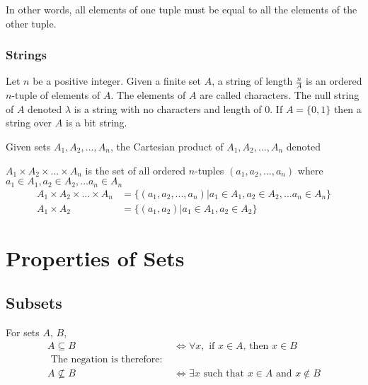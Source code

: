 \documentclass[11pt]{article}
\begin{document}
In other words, all elements of one tuple must be equal to all the elements of the other tuple.

\subsubsection{Strings}
\begin{definition}[Strings]\label{def:string}
    Let $n$ be a positive integer. Given a finite set $A$, a string
    of length $\frac{n}{A}$ is an ordered $n$-tuple of elements of $A$.
    The elements of $A$ are called characters. The null string of $A$
    denoted $\lambda$ is a string with no characters and length of $0$.
    If $A = \{0, 1\}$ then a string over $A$ is a bit string.
\end{definition}

\begin{definition}\label{def:cartesian-product}
    Given sets $A_1, A_2, ..., A_n$, the Cartesian product of $A_1, A_2, ..., A_n$
    denoted

    $A_1 \times A_2 \times ... \times A_n$ is the set of all ordered $n$-tuples
    $(a_1, a_2, ..., a_n)$ where $a_1 \in A_1, a_2 \in A_2, ... a_n \in A_n$
    \begin{equation}
        \begin{aligned}
            A_1 \times A_2 \times ... \times A_n &= \{ (a_1, a_2, ..., a_n) | a_1 \in A_1, a_2 \in A_2, ... a_n \in A_n \} \\
            A_1 \times A_2 &= \{ (a_1, a_2) | a_1 \in A_1, a_2 \in A_2 \}
        \end{aligned}
    \end{equation}
\end{definition}


\section{Properties of Sets}

\subsection{Subsets}

\begin{definition}[Subset]\label{def:subset}
    For sets $A$, $B$,
    \begin{align*}
        A \subseteq B &\iff \forall x, \text{ if $x \in A$, then $x \in B$} \\
        \text{ The negation is therefore: } & \\
        A \not \subseteq B &\iff \exists x \text{ such that $x \in A$ and $x \notin B$}
    \end{align*}
\end{definition}
\end{document}
